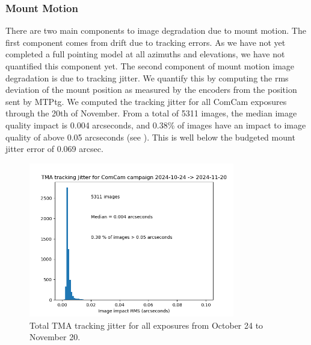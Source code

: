 \subsubsection{Mount Motion}

There are two main components to image degradation due to mount motion. The first component comes from drift due to tracking errors. As we have not yet completed a full pointing model at all azimuths and elevations, we have not quantified this component yet. The second component of mount motion image degradation is due to tracking jitter. We quantify this by computing the rms deviation of the mount position as measured by the encoders from the position sent by MTPtg. We computed the tracking jitter for all ComCam exposures through the 20th of November. From a total of 5311 images, the median image quality impact is 0.004 arcseconds, and 0.38\% of images have an impact to image quality of above 0.05 arcseconds (see ). This is well below the budgeted mount jitter error of 0.069 arcsec.

\begin{figure}
  \begin{center}
    \includegraphics[width=0.8\textwidth]{image_quality_figures/ComCam_Mount_Jitter_21Nov24.png}
  \end{center}
  \caption{Total TMA tracking jitter for all exposures from October 24 to November 20.}
  \label{fig:jitter}
\end{figure}

